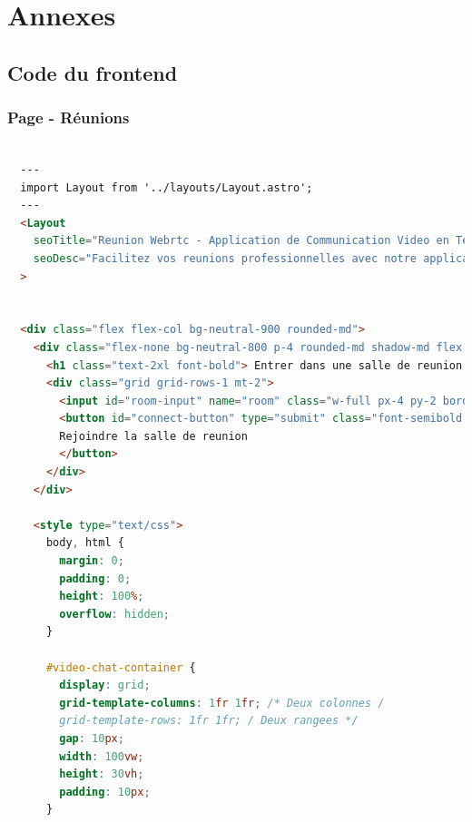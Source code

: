 \documentclass[12pt, a4paper, oneside]{article}
\begin{document}
\newpage

\section{Annexes}

\subsection{Code du frontend}

\subsubsection{Page - Réunions}

\begin{lstlisting}[language=HTML, caption={Page - Réunions}, label=Page - Reunions]

  ---
  import Layout from '../layouts/Layout.astro';
  ---
  <Layout
    seoTitle="Reunion Webrtc - Application de Communication Video en Temps Reel | Acody"
    seoDesc="Facilitez vos reunions professionnelles avec notre application de projet Webrtc. Effectuez des appels video en temps reel, abandonnez les appels en un clic, et gerez facilement le son et la camera. Optimisez votre collaboration a distance avec des fonctionnalites simples et efficaces."
  >
  
  
  <div class="flex flex-col bg-neutral-900 rounded-md">
    <div class="flex-none bg-neutral-800 p-4 rounded-md shadow-md flex flex-col">
      <h1 class="text-2xl font-bold"> Entrer dans une salle de reunion </h1>
      <div class="grid grid-rows-1 mt-2">
        <input id="room-input" name="room" class="w-full px-4 py-2 border rounded-md focus:outline-none focus:border-teal-500 bg-neutral-700 col-span-6" placeholder="Numero de votre salle de reunion" />
        <button id="connect-button" type="submit" class="font-semibold w-full bg-teal-500 text-white px-4 py-2 rounded-md hover:bg-teal-700 focus:outline-none col-start-8">
        Rejoindre la salle de reunion
        </button>
      </div>
    </div>
    
    <style type="text/css">
      body, html {
        margin: 0;
        padding: 0;
        height: 100%;
        overflow: hidden;
      }
    
      #video-chat-container {
        display: grid;
        grid-template-columns: 1fr 1fr; /* Deux colonnes /
        grid-template-rows: 1fr 1fr; / Deux rangees */
        gap: 10px;
        width: 100vw;
        height: 30vh;
        padding: 10px;
      }
    

\end{lstlisting}
\end{document}
